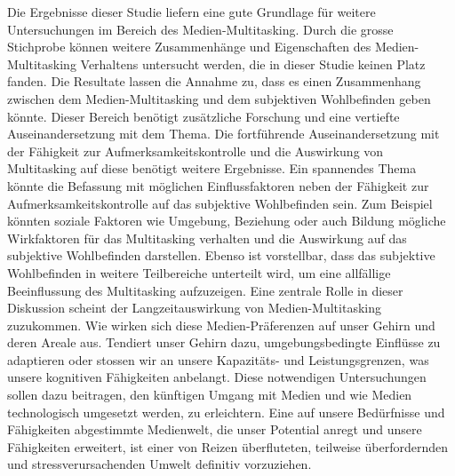 \label{section.diskussion.ausblick}
Die Ergebnisse dieser Studie liefern eine gute Grundlage für weitere Untersuchungen im Bereich des Medien-Multitasking. Durch die grosse Stichprobe können weitere Zusammenhänge und Eigenschaften des Medien-Multitasking Verhaltens untersucht werden, die in dieser Studie keinen Platz fanden. Die Resultate lassen die Annahme zu, dass es einen Zusammenhang zwischen dem Medien-Multitasking und dem subjektiven Wohlbefinden geben könnte. Dieser Bereich benötigt zusätzliche Forschung und eine vertiefte Auseinandersetzung mit dem Thema. Die fortführende Auseinandersetzung mit der Fähigkeit zur Aufmerksamkeitskontrolle und die Auswirkung von Multitasking auf diese benötigt weitere Ergebnisse. Ein spannendes Thema könnte die Befassung mit möglichen Einflussfaktoren neben der Fähigkeit zur Aufmerksamkeitskontrolle auf das subjektive Wohlbefinden sein. Zum Beispiel könnten soziale Faktoren wie Umgebung, Beziehung oder auch Bildung mögliche Wirkfaktoren für das Multitasking verhalten und die Auswirkung auf das subjektive Wohlbefinden darstellen. Ebenso ist vorstellbar, dass das subjektive Wohlbefinden in weitere Teilbereiche unterteilt wird, um eine allfällige Beeinflussung des Multitasking aufzuzeigen. Eine zentrale Rolle in dieser Diskussion scheint der Langzeitauswirkung von Medien-Multitasking zuzukommen. Wie wirken sich diese Medien-Präferenzen auf unser Gehirn und deren Areale aus. Tendiert unser Gehirn dazu, umgebungsbedingte Einflüsse zu adaptieren oder stossen wir an unsere Kapazitäts- und Leistungsgrenzen, was unsere kognitiven Fähigkeiten anbelangt. Diese notwendigen Untersuchungen sollen dazu beitragen, den künftigen Umgang mit Medien und wie Medien technologisch umgesetzt werden, zu erleichtern. Eine auf unsere Bedürfnisse und Fähigkeiten abgestimmte Medienwelt, die unser Potential anregt und unsere Fähigkeiten erweitert, ist einer von Reizen überfluteten, teilweise überfordernden und stressverursachenden Umwelt definitiv vorzuziehen. 


